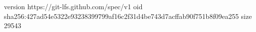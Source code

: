 version https://git-lfs.github.com/spec/v1
oid sha256:427ad54e5322e93238399799af16c2f31d4be743d7acffab90f751b8f09ea255
size 29543
